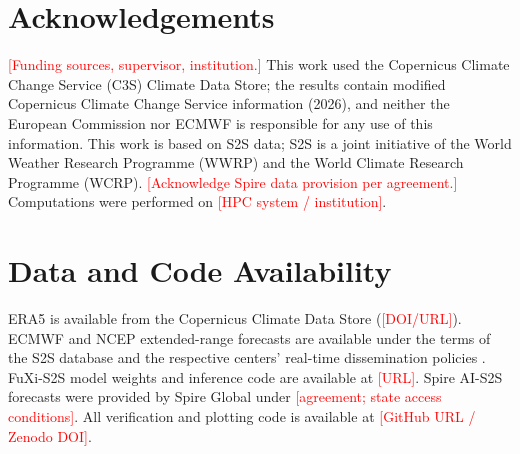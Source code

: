 \documentclass[11pt]{article}
\newcommand{\ph}[1]{\textcolor{red}{[#1]}}
\begin{document}
\section*{Acknowledgements}

\ph{Funding sources, supervisor, institution.} This work used the
Copernicus Climate Change Service (C3S) Climate Data Store; the
results contain modified Copernicus Climate Change Service
information (2026), and neither the European Commission nor ECMWF is
responsible for any use of this information. This work is based on
S2S data; S2S is a joint initiative of the World Weather Research
Programme (WWRP) and the World Climate Research Programme (WCRP).
\ph{Acknowledge Spire data provision per agreement.} Computations
were performed on \ph{HPC system / institution}.

\section*{Data and Code Availability}

ERA5 is available from the Copernicus Climate Data Store
(\ph{DOI/URL}). ECMWF and NCEP extended-range forecasts are available
under the terms of the S2S database and the respective centers'
real-time dissemination policies \citep{vitart2017}. FuXi-S2S model
weights and inference code are available at \ph{URL}. Spire AI-S2S
forecasts were provided by Spire Global under \ph{agreement; state
access conditions}. All verification and plotting code is available
at \ph{GitHub URL / Zenodo DOI}.
\end{document}
